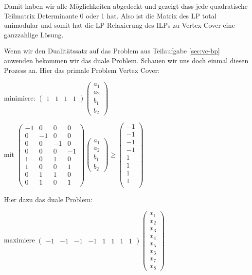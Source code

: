 Damit haben wir alle Möglichkeiten abgedeckt und gezeigt dass jede quadratische Teilmatrix Determinante 0 oder 1 hat. Also ist die Matrix des LP total unimodular und somit hat die LP-Relaxierung des ILPs zu Vertex Cover eine ganzzahlige Lösung.

\subexercise

Wenn wir den Dualitätssatz auf das Problem aus Teilaufgabe \ref{sec:vc-bp} anwenden bekommen wir das duale Problem. Schauen wir uns doch einmal diesen Prozess an.
Hier das primale Problem Vertex Cover:

minimiere: $\begin{pmatrix} 1 & 1 & 1 & 1 \end{pmatrix} \begin{pmatrix} a_1 \\ a_2 \\ b_1 \\ b_2 \end{pmatrix}$

mit $
\begin{pmatrix}
-1 & 0 & 0 & 0 \\
0 & -1 & 0 & 0 \\
0 & 0 & -1 & 0 \\
0 & 0 & 0 & -1 \\
1 & 0 & 1 & 0 \\
1 & 0 & 0 & 1 \\
0 & 1 & 1 & 0 \\
0 & 1 & 0 & 1
\end{pmatrix}
\begin{pmatrix} a_1 \\ a_2 \\ b_1 \\ b_2 \end{pmatrix}
\geq
\begin{pmatrix}
-1 \\
-1 \\
-1 \\
-1 \\
1 \\
1 \\
1 \\
1 \\
\end{pmatrix}
	$

Hier dazu das duale Problem:

maximiere $\begin{pmatrix} -1& - 1& - 1& - 1& 1 & 1 & 1 & 1 \end{pmatrix} \begin{pmatrix} x_1 \\ x_2 \\ x_3 \\ x_4 \\ x_5 \\ x_6 \\ x_7 \\ x_8 \end{pmatrix}$

